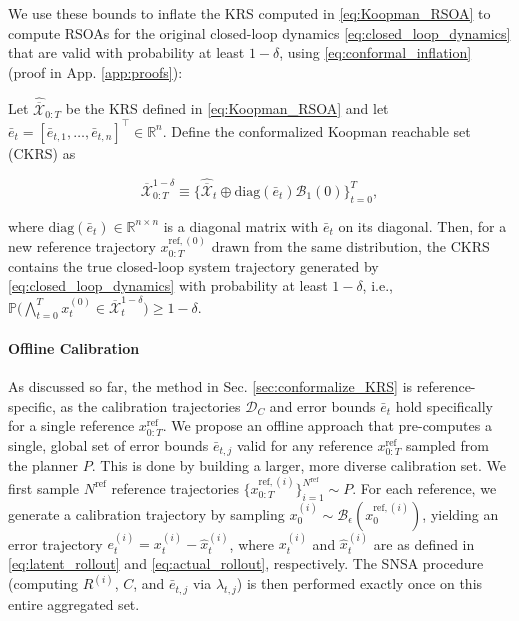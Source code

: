 \documentclass{l4dc2026}
\begin{document}
\noindent We use these bounds to inflate the KRS computed in \eqref{eq:Koopman_RSOA} to compute RSOAs for the original closed-loop dynamics \eqref{eq:closed_loop_dynamics} that are valid with probability at least $1-\delta$, using \eqref{eq:conformal_inflation} (proof in App. \ref{app:proofs}):

\begingroup
\setlength{\abovedisplayskip}{6pt}
\setlength{\belowdisplayskip}{6pt}
\setcounter{theorem}{0}
\begin{theorem}
\label{thm:ckrs_coverage}
Let $\hat{\overline{\mathcal{X}}}_{0:T}$ be the KRS defined in \eqref{eq:Koopman_RSOA} and let $\bar e_t = [\bar e_{t,1}, \ldots, \bar e_{t,n}]^\top \in \mathbb{R}^n$. Define the conformalized Koopman reachable set (CKRS) as

\begin{equation}
\overline{\mathcal{X}}_{0:T}^{1-\delta} \equiv \bigl\{ \hat{\overline{\mathcal{X}}}_t \oplus \mathrm{diag}(\bar e_t) \mathcal{B}_1(0) \bigr\}_{t=0}^T,
\label{eq:conformal_inflation}
\end{equation}

\noindent where $\mathrm{diag}(\bar e_t) \in \mathbb{R}^{n\times n}$ is a diagonal matrix with $\bar e_t$ on its diagonal. Then, for a new reference trajectory $x_{0:T}^{\textrm{ref}, (0)}$ drawn from the same distribution, the CKRS contains the true closed-loop system trajectory generated by \eqref{eq:closed_loop_dynamics} with probability at least $1-\delta$, i.e., $\mathbb{P}\big( \bigwedge_{t=0}^T x_t^{(0)} \in \overline{\mathcal{X}}_t^{1-\delta} \big) \ge 1-\delta$.
\end{theorem}
\endgroup

\paragraph{Offline Calibration}
As discussed so far, the method in Sec. \ref{sec:conformalize_KRS} is reference-specific, as the calibration trajectories $\mathcal{D}_C$ and error bounds $\bar e_t$ hold specifically for a single reference $x_{0:T}^{\text{ref}}$. We propose an offline approach that pre-computes a single, global set of error bounds $\bar e_{t,j}$ valid for any reference $x_{0:T}^{\text{ref}}$ sampled from the planner $P$. This is done by building a larger, more diverse calibration set. We first sample $N^{\text{ref}}$ reference trajectories $\{x_{0:T}^{\text{ref},(i)}\}_{i=1}^{N^{\text{ref}}} \sim P$. For each reference, we generate a calibration trajectory by sampling $x_0^{(i)} \sim \mathcal{B}_\epsilon(x_{0}^{ \text{ref},(i)})$, yielding an error trajectory $e_t^{(i)} = x_t^{(i)} - \hat x_{t}^{(i)}$, where $x_t^{(i)}$ and $\hat x_{t}^{(i)}$ are as defined in \eqref{eq:latent_rollout} and \eqref{eq:actual_rollout}, respectively. The SNSA procedure (computing $R^{(i)}$, $C$, and $\bar e_{t,j}$ via $\lambda_{t,j}$) is then performed exactly once on this entire aggregated set.
\end{document}
